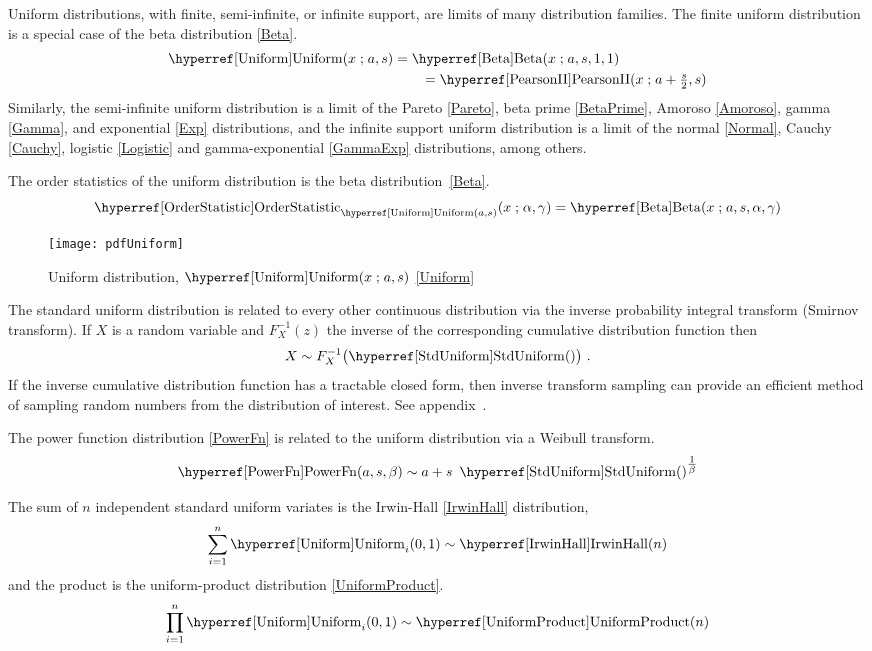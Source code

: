 Uniform distributions, with finite, semi-infinite, or infinite support, are limits of many distribution families. The finite uniform distribution is a special case of the beta distribution \eqref{Beta}.
\begin{align*}
 \opr{Uniform}(x\given a,s)  &=  \opr{Beta}(x\given a, s, 1,1) 	\checked
 \\
 &\qquad=  \opr{PearsonII}(x\given a+\tfrac{s}{2}, s)
\end{align*}
Similarly, the semi-infinite uniform distribution is a limit of the Pareto \eqref{Pareto}, beta prime \eqref{BetaPrime}, Amoroso \eqref{Amoroso}, gamma \eqref{Gamma}, and exponential  \eqref{Exp} distributions, and the infinite support uniform distribution is a limit of the normal \eqref{Normal}, Cauchy \eqref{Cauchy}, logistic \eqref{Logistic} and  gamma-exponential  \eqref{GammaExp} distributions, among others. 

The order statistics  of the uniform distribution is the beta distribution~\eqref{Beta}.
\[
\opr{OrderStatistic}_{\opr{Uniform}(a,s)}(x \given \alpha, \gamma) =  \opr{Beta}(x\given a, s, \alpha, \gamma) 
\checked
\notag
\]


\begin{figure}[t]
\begin{center}
\texttt{[image: pdfUniform]}
\end{center}
\caption[Uniform distribution]{Uniform distribution, $\opr{Uniform}(x\given a,s)$ \eqref{Uniform}}
\end{figure}


The standard uniform distribution is related to every other continuous distribution via the  inverse probability integral transform (Smirnov transform). If $X$ is a random variable and $F_X^{-1}(z)$ the inverse of the corresponding cumulative distribution function then 
\[ 
X \sim F_X^{-1}\bigl( \opr{StdUniform}() \bigr) \ .  \checked
\notag
\]
If the inverse cumulative distribution function has a tractable closed form, then inverse transform sampling can provide an efficient method of sampling random numbers from the distribution of interest. See appendix~.

The power function distribution \eqref{PowerFn} is related to the uniform distribution via a Weibull transform.
\[
\opr{PowerFn}(a,s,\beta) \sim a + s\ \opr{StdUniform}()^{\tfrac{1}{\beta}}  \checked
\notag
\]

The sum of $n$ independent standard uniform variates is the  Irwin-Hall \eqref{IrwinHall} distribution,
\[
\sum_{i=1}^{n} \opr{Uniform}_i(0,1)  \sim \opr{IrwinHall}(n) \checked
\notag
\]
and the product is the uniform-product distribution \eqref{UniformProduct}.
\[
\prod_{i=1}^{n} \opr{Uniform}_i(0,1)  \sim \opr{UniformProduct}(n) \checked
\notag
\]




